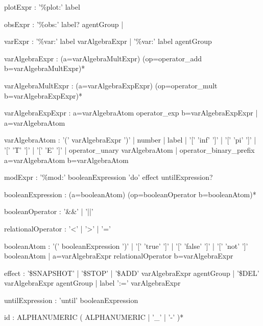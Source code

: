 \begin{bnfsource}



plotExpr :
  '\%plot:' label

obsExpr :
  '\%obs:' label? agentGroup
  | 

varExpr :
  '\%var:' label varAlgebraExpr
  | '\%var:' label agentGroup

varAlgebraExpr :
  (a=varAlgebraMultExpr) (op=operator_add b=varAlgebraMultExpr)*
  
varAlgebraMultExpr :
  (a=varAlgebraExpExpr) (op=operator_mult b=varAlgebraExpExpr)*
  
varAlgebraExpExpr :
  a=varAlgebraAtom operator_exp b=varAlgebraExpExpr
  | a=varAlgebraAtom
  
varAlgebraAtom :
  '(' varAlgebraExpr ')'
  | number
  | label
  | '[' 'inf' ']'
  | '[' 'pi' ']'
  | '[' 'T' ']'
  | '[' 'E' ']'
  | operator_unary varAlgebraAtom
  | operator_binary_prefix a=varAlgebraAtom b=varAlgebraAtom
  
modExpr :
  '\%mod:' booleanExpression 'do' effect untilExpression?
  

booleanExpression :
  (a=booleanAtom) (op=booleanOperator b=booleanAtom)*
  
booleanOperator :
  '&&' | '||'

relationalOperator :
  '<' | '>' | '='

  
booleanAtom :
  '(' booleanExpression ')'
  | '[' 'true' ']'
  | '[' 'false' ']'
  | '[' 'not' ']' booleanAtom
  | a=varAlgebraExpr relationalOperator b=varAlgebraExpr

effect :
  '\$SNAPSHOT'
  | '\$STOP'
  | '\$ADD' varAlgebraExpr agentGroup
  | '\$DEL' varAlgebraExpr agentGroup
  | label ':=' varAlgebraExpr
  
untilExpression :
  'until' booleanExpression
  
  
  
id :
  ALPHANUMERIC ( ALPHANUMERIC | '_' | '-' )*


\end{bnfsource}
